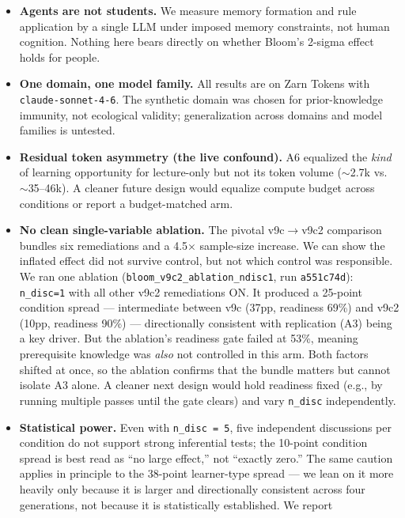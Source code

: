 \documentclass[11pt]{article}
\begin{document}
\begin{itemize}
  \item \textbf{Agents are not students.}  We measure memory formation and rule
    application by a single LLM under imposed memory constraints, not human cognition.
    Nothing here bears directly on whether Bloom's 2-sigma effect holds for people.
  \item \textbf{One domain, one model family.}  All results are on Zarn Tokens with
    \texttt{claude-sonnet-4-6}.  The synthetic domain was chosen for prior-knowledge
    immunity, not ecological validity; generalization across domains and model families
    is untested.
  \item \textbf{Residual token asymmetry (the live confound).}  A6 equalized the
    \emph{kind} of learning opportunity for lecture-only but not its token volume
    ($\sim$2.7k vs.\ $\sim$35--46k).  A cleaner future design would equalize compute
    budget across conditions or report a budget-matched arm.
  \item \textbf{No clean single-variable ablation.}  The pivotal v9c$\to$v9c2
    comparison bundles six remediations and a 4.5$\times$ sample-size increase.  We
    can show the inflated effect did not survive control, but not which control was
    responsible.  We ran one ablation (\texttt{bloom\_v9c2\_ablation\_ndisc1}, run
    \texttt{a551c74d}): \texttt{n\_disc=1} with all other v9c2 remediations ON.  It
    produced a 25-point condition spread --- intermediate between v9c (37pp, readiness
    69\%) and v9c2 (10pp, readiness 90\%) --- directionally consistent with
    replication (A3) being a key driver.  But the ablation's readiness gate failed at
    53\%, meaning prerequisite knowledge was \emph{also} not controlled in this arm.
    Both factors shifted at once, so the ablation confirms that the bundle matters but
    cannot isolate A3 alone.  A cleaner next design would hold readiness fixed (e.g.,
    by running multiple passes until the gate clears) and vary \texttt{n\_disc}
    independently.
  \item \textbf{Statistical power.}  Even with \texttt{n\_disc = 5}, five independent
    discussions per condition do not support strong inferential tests; the 10-point
    condition spread is best read as ``no large effect,'' not ``exactly zero.''  The
    same caution applies in principle to the 38-point learner-type spread --- we lean
    on it more heavily only because it is larger and directionally consistent across
    four generations, not because it is statistically established.  We report

\end{itemize}
\end{document}
